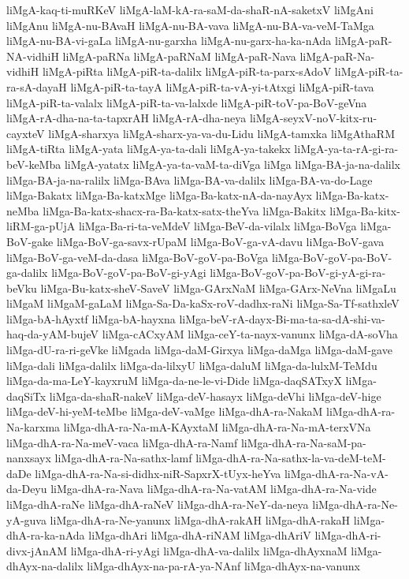 {liMgA-kaq-ti-muRKeV
liMgA-laM-kA-ra-saM-da-shaR-nA-saketxV
liMgAni
liMgAnu
liMgA-nu-BAvaH
liMgA-nu-BA-vava
liMgA-nu-BA-va-veM-TaMga
liMgA-nu-BA-vi-gaLa
liMgA-nu-garxha
liMgA-nu-garx-ha-ka-nAda
liMgA-paR-NA-vidhiH
liMgA-paRNa
liMgA-paRNaM
liMgA-paR-Nava
liMgA-paR-Na-vidhiH
liMgA-piRta
liMgA-piR-ta-dalilx
liMgA-piR-ta-parx-sAdoV
liMgA-piR-ta-ra-sA-dayaH
liMgA-piR-ta-tayA
liMgA-piR-ta-vA-yi-tAtxgi
liMgA-piR-tava
liMgA-piR-ta-valalx
liMgA-piR-ta-va-lalxde
liMgA-piR-toV-pa-BoV-geVna
liMgA-rA-dha-na-ta-tapxrAH
liMgA-rA-dha-neya
liMgA-seyxV-noV-kitx-ru-cayxteV
liMgA-sharxya
liMgA-sharx-ya-va-du-Lidu
liMgA-tamxka
liMgAthaRM
liMgA-tiRta
liMgA-yata
liMgA-ya-ta-dali
liMgA-ya-takekx
liMgA-ya-ta-rA-gi-ra-beV-keMba
liMgA-yatatx
liMgA-ya-ta-vaM-ta-diVga
liMga
liMga-BA-ja-na-dalilx
liMga-BA-ja-na-ralilx
liMga-BAva
liMga-BA-va-dalilx
liMga-BA-va-do-Lage
liMga-Bakatx
liMga-Ba-katxMge
liMga-Ba-katx-nA-da-nayAyx
liMga-Ba-katx-neMba
liMga-Ba-katx-shacx-ra-Ba-katx-satx-theYva
liMga-Bakitx
liMga-Ba-kitx-liRM-ga-pUjA
liMga-Ba-ri-ta-veMdeV
liMga-BeV-da-vilalx
liMga-BoVga
liMga-BoV-gake
liMga-BoV-ga-savx-rUpaM
liMga-BoV-ga-vA-davu
liMga-BoV-gava
liMga-BoV-ga-veM-da-dasa
liMga-BoV-goV-pa-BoVga
liMga-BoV-goV-pa-BoV-ga-dalilx
liMga-BoV-goV-pa-BoV-gi-yAgi
liMga-BoV-goV-pa-BoV-gi-yA-gi-ra-beVku
liMga-Bu-katx-sheV-SaveV
liMga-GArxNaM
liMga-GArx-NeVna
liMgaLu
liMgaM
liMgaM-gaLaM
liMga-Sa-Da-kaSx-roV-dadhx-raNi
liMga-Sa-Tf-sathxleV
liMga-bA-hAyxtf
liMga-bA-hayxna
liMga-beV-rA-dayx-Bi-ma-ta-sa-dA-shi-va-haq-da-yAM-bujeV
liMga-cACxyAM
liMga-ceY-ta-nayx-vanunx
liMga-dA-soVha
liMga-dU-ra-ri-geVke
liMgada
liMga-daM-Girxya
liMga-daMga
liMga-daM-gave
liMga-dali
liMga-dalilx
liMga-da-lilxyU
liMga-daluM
liMga-da-lulxM-TeMdu
liMga-da-ma-LeY-kayxruM
liMga-da-ne-le-vi-Dide
liMga-daqSATxyX
liMga-daqSiTx
liMga-da-shaR-nakeV
liMga-deV-hasayx
liMga-deVhi
liMga-deV-hige
liMga-deV-hi-yeM-teMbe
liMga-deV-vaMge
liMga-dhA-ra-NakaM
liMga-dhA-ra-Na-karxma
liMga-dhA-ra-Na-mA-KAyxtaM
liMga-dhA-ra-Na-mA-terxVNa
liMga-dhA-ra-Na-meV-vaca
liMga-dhA-ra-Namf
liMga-dhA-ra-Na-saM-pa-nanxsayx
liMga-dhA-ra-Na-sathx-lamf
liMga-dhA-ra-Na-sathx-la-va-deM-teM-daDe
liMga-dhA-ra-Na-si-didhx-niR-SapxrX-tUyx-heYva
liMga-dhA-ra-Na-vA-da-Deyu
liMga-dhA-ra-Nava
liMga-dhA-ra-Na-vatAM
liMga-dhA-ra-Na-vide
liMga-dhA-raNe
liMga-dhA-raNeV
liMga-dhA-ra-NeY-da-neya
liMga-dhA-ra-Ne-yA-guva
liMga-dhA-ra-Ne-yanunx
liMga-dhA-rakAH
liMga-dhA-rakaH
liMga-dhA-ra-ka-nAda
liMga-dhAri
liMga-dhA-riNAM
liMga-dhAriV
liMga-dhA-ri-divx-jAnAM
liMga-dhA-ri-yAgi
liMga-dhA-va-dalilx
liMga-dhAyxnaM
liMga-dhAyx-na-dalilx
liMga-dhAyx-na-pa-rA-ya-NAnf
liMga-dhAyx-na-vanunx
}
